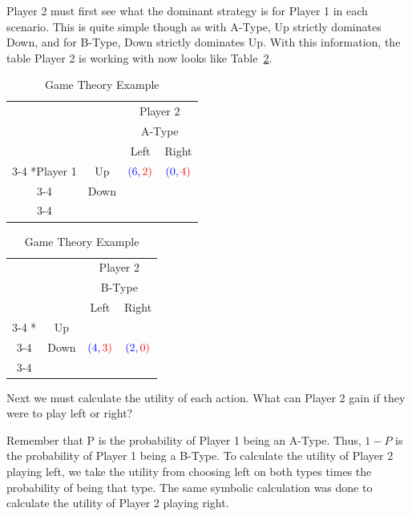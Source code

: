 \documentclass[letterpaper,12pt]{report}
\newcounter{taskset}
\newcounter{action}[taskset]
\begin{document}
Player 2 must first see what the dominant strategy is for Player 1 in each scenario. This is quite simple though as with A-Type, Up strictly dominates Down, and for B-Type, Down strictly dominates Up. With this information, the table Player 2 is working with now looks like Table~\ref{Tab:game_theory_2}.

\begin{table}[!bt]
    \setlength{\extrarowheight}{2pt}
    \begin{tabular}{cc|c|c|}
      & \multicolumn{1}{c}{} & \multicolumn{2}{c}{\color{red}Player 2}\\
      & \multicolumn{1}{c}{} & \multicolumn{2}{c}{\color{red}A-Type}\\
      & \multicolumn{1}{c}{} & \multicolumn{1}{c}{\color{red}Left}  & \multicolumn{1}{c}{\color{red}Right} \\\cline{3-4}
      \multirow{2}*{\color{blue}Player 1}  & \color{blue}Up & $\color{blue}(6,\color{red}2)$ & $\color{blue}(0,\color{red}4)$ \\\cline{3-4}
      & \color{blue}Down &  &  \\\cline{3-4}
    \end{tabular}
    \begin{tabular}{cc|c|c|}
      & \multicolumn{1}{c}{} & \multicolumn{2}{c}{\color{red}Player 2}\\
      & \multicolumn{1}{c}{} & \multicolumn{2}{c}{\color{red}B-Type}\\
      & \multicolumn{1}{c}{} & \multicolumn{1}{c}{\color{red}Left}  & \multicolumn{1}{c}{\color{red}Right} \\\cline{3-4}
      \multirow{2}*{}  & \color{blue}Up &  &  \\\cline{3-4}
      & \color{blue}Down & $\color{blue}(4,\color{red}3)$ & $\color{blue}(2,\color{red}0)$ \\\cline{3-4}
    \end{tabular}
\caption{Game Theory Example}
\label{Tab:game_theory_2}
\end{table}

\bigskip

Next we must calculate the utility of each action. What can Player 2 gain if they were to play left or right?

Remember that P is the probability of Player 1 being an A-Type. Thus, $1-P$ is the probability of Player 1 being a B-Type. To calculate the utility of Player 2 playing left, we take the utility from choosing left on both types times the probability of being that type. The same symbolic calculation was done to calculate the utility of Player 2 playing right.
\end{document}
